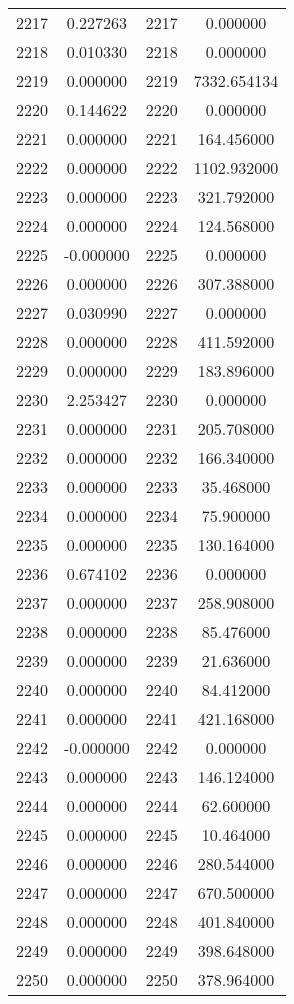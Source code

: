 \documentclass[12pt]{article}
\begin{document}
\begin{longtable}{@{}cccc@{}}
2217 & 0.227263 & 2217 & 0.000000 \\
2218 & 0.010330 & 2218 & 0.000000 \\
2219 & 0.000000 & 2219 & 7332.654134 \\
2220 & 0.144622 & 2220 & 0.000000 \\
2221 & 0.000000 & 2221 & 164.456000 \\
2222 & 0.000000 & 2222 & 1102.932000 \\
2223 & 0.000000 & 2223 & 321.792000 \\
2224 & 0.000000 & 2224 & 124.568000 \\
2225 & -0.000000 & 2225 & 0.000000 \\
2226 & 0.000000 & 2226 & 307.388000 \\
2227 & 0.030990 & 2227 & 0.000000 \\
2228 & 0.000000 & 2228 & 411.592000 \\
2229 & 0.000000 & 2229 & 183.896000 \\
2230 & 2.253427 & 2230 & 0.000000 \\
2231 & 0.000000 & 2231 & 205.708000 \\
2232 & 0.000000 & 2232 & 166.340000 \\
2233 & 0.000000 & 2233 & 35.468000 \\
2234 & 0.000000 & 2234 & 75.900000 \\
2235 & 0.000000 & 2235 & 130.164000 \\
2236 & 0.674102 & 2236 & 0.000000 \\
2237 & 0.000000 & 2237 & 258.908000 \\
2238 & 0.000000 & 2238 & 85.476000 \\
2239 & 0.000000 & 2239 & 21.636000 \\
2240 & 0.000000 & 2240 & 84.412000 \\
2241 & 0.000000 & 2241 & 421.168000 \\
2242 & -0.000000 & 2242 & 0.000000 \\
2243 & 0.000000 & 2243 & 146.124000 \\
2244 & 0.000000 & 2244 & 62.600000 \\
2245 & 0.000000 & 2245 & 10.464000 \\
2246 & 0.000000 & 2246 & 280.544000 \\
2247 & 0.000000 & 2247 & 670.500000 \\
2248 & 0.000000 & 2248 & 401.840000 \\
2249 & 0.000000 & 2249 & 398.648000 \\
2250 & 0.000000 & 2250 & 378.964000 \\

\end{longtable}
\end{document}
